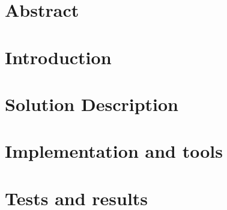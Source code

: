 \documentclass[11pt]{article}
\begin{document}
\newpage


\section*{Abstract}
\label{Abstract}


 
\newpage





\clearpage




\section{Introduction}
	\label{s:Introduction}


   
\clearpage

\section{Solution Description}
	\label{s:solution}
	
	
	
\clearpage


\section{Implementation and tools}
	\label{s:tools}
	
	
\clearpage


\section{Tests and results}
	\label{s:results}
	
\clearpage
\end{document}
